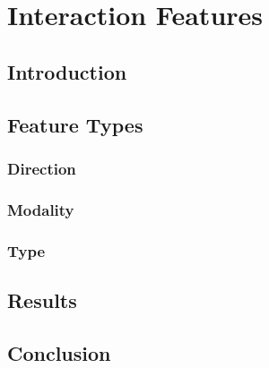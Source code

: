 
\chapter{Interaction Features}
\label{cha:fs}

\section{Introduction}
\label{sec:intro}

\section{Feature Types}
\label{sec:ft}

\subsection{Direction}
\label{sec:dir}

\subsection{Modality}
\label{sec:mod}

\subsection{Type}
\label{sec:type}

\section{Results}
\label{sec:results}

\section{Conclusion}
\label{sec:conc}

